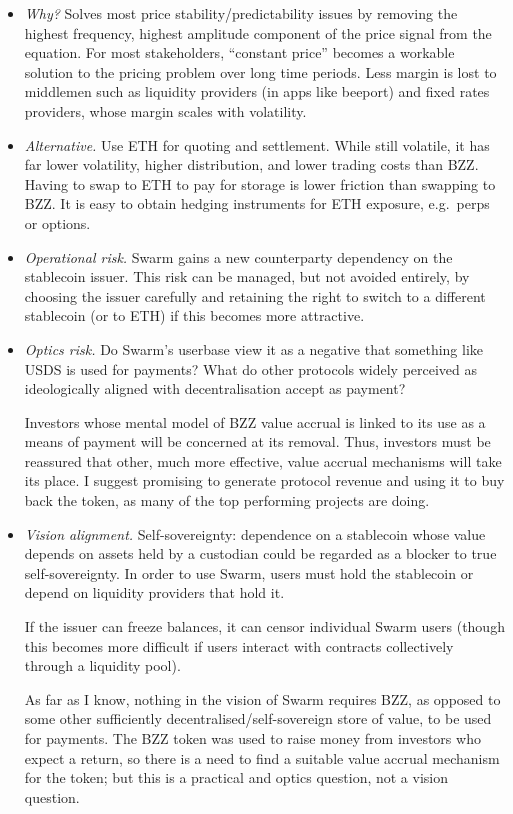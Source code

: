 \begin{itemize}
  \item \emph{Why?} Solves most price stability/predictability issues by removing the highest frequency, highest amplitude component of the price signal from the equation. For most stakeholders, ``constant price'' becomes a workable solution to the pricing problem over long time periods. Less margin is lost to middlemen such as liquidity providers (in apps like beeport) and fixed rates providers, whose margin scales with volatility.

  \item \emph{Alternative.} Use ETH for quoting and settlement. While still volatile, it has far lower volatility, higher distribution, and lower trading costs than BZZ. Having to swap to ETH to pay for storage is lower friction than swapping to BZZ. It is easy to obtain hedging instruments for ETH exposure, e.g.\ perps or options.

  \item \emph{Operational risk.} Swarm gains a new counterparty dependency on the stablecoin issuer. This risk can be managed, but not avoided entirely, by choosing the issuer carefully and retaining the right to switch to a different stablecoin (or to ETH) if this becomes more attractive.

  \item \emph{Optics risk.} Do Swarm's userbase view it as a negative that something like USDS is used for payments? What do other protocols widely perceived as ideologically aligned with decentralisation accept as payment?

  Investors whose mental model of BZZ value accrual is linked to its use as a means of payment will be concerned at its removal. Thus, investors must be reassured that other, much more effective, value accrual mechanisms will take its place. I suggest promising to generate protocol revenue and using it to buy back the token, as many of the top performing projects are doing.

  \item \emph{Vision alignment.} Self-sovereignty: dependence on a stablecoin whose value depends on assets held by a custodian could be regarded as a blocker to true self-sovereignty. In order to use Swarm, users must hold the stablecoin or depend on liquidity providers that hold it.

  If the issuer can freeze balances, it can censor individual Swarm users (though this becomes more difficult if users interact with contracts collectively through a liquidity pool).

  As far as I know, nothing in the vision of Swarm requires BZZ, as opposed to some other sufficiently decentralised/self-sovereign store of value, to be used for payments. The BZZ token was used to raise money from investors who expect a return, so there is a need to find a suitable value accrual mechanism for the token; but this is a practical and optics question, not a vision question.
\end{itemize}

